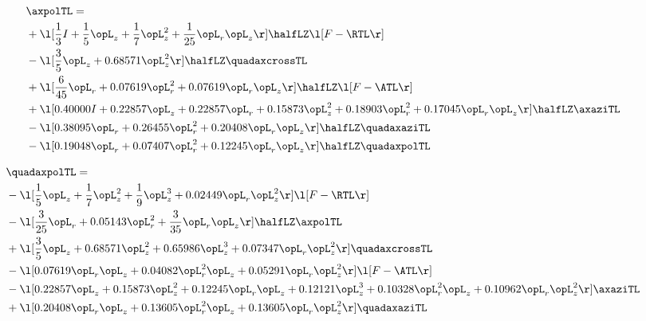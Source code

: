 \begin{alignat}{2} 
\label{eq:linaxpolTL_1} 
& \axpolTL = \\ 
& + \l[ \frac{1}{3} I + \frac{1}{5} \opL_z + \frac{1}{7} \opL_z^{2} + \frac{1}{25} \opL_r \opL_z  \r] \halfLZ \l[ F - \RTL \r] \nonumber \\ 
& - \l[ \frac{3}{5} \opL_z +  0.68571 \opL_z^{2}  \r] \halfLZ \quadaxcrossTL \nonumber \\ 
& + \l[ \frac{6}{45} \opL_r +  0.07619 \opL_r^{2} +  0.07619 \opL_r \opL_z  \r] \halfLZ \l[ F - \ATL \r] \nonumber \\ 
& + \l[  0.40000 I +  0.22857 \opL_z +  0.22857 \opL_r +  0.15873 \opL_z^{2} +  0.18903 \opL_r^{2} +  0.17045 \opL_r \opL_z  \r] \halfLZ \axaziTL \nonumber \\ 
& - \l[  0.38095 \opL_r +  0.26455 \opL_r^{2} +  0.20408 \opL_r \opL_z  \r] \halfLZ \quadaxaziTL \nonumber \\ 
& - \l[  0.19048 \opL_r +  0.07407 \opL_r^{2} +  0.12245 \opL_r \opL_z  \r] \halfLZ \quadaxpolTL \nonumber \\ 
\end{alignat} 


\begin{alignat}{2} 
\label{eq:quadaxpolTL_1} 
& \quadaxpolTL = \\ 
& - \l[ \frac{1}{5} \opL_z + \frac{1}{7} \opL_z^{2} + \frac{1}{9} \opL_z^{3} +  0.02449 \opL_r \opL_z^{2}  \r] \l[ F - \RTL \r] \nonumber \\ 
& - \l[ \frac{3}{25} \opL_r +  0.05143 \opL_r^{2} + \frac{3}{35} \opL_r \opL_z  \r] \halfLZ \axpolTL \nonumber \\ 
& + \l[ \frac{3}{5} \opL_z +  0.68571 \opL_z^{2} +  0.65986 \opL_z^{3} +  0.07347 \opL_r \opL_z^{2}  \r] \quadaxcrossTL \nonumber \\ 
& - \l[  0.07619 \opL_r \opL_z +  0.04082 \opL_r^{2} \opL_z +  0.05291 \opL_r \opL_z^{2}  \r] \l[ F - \ATL \r] \nonumber \\ 
& - \l[  0.22857 \opL_z +  0.15873 \opL_z^{2} +  0.12245 \opL_r \opL_z +  0.12121 \opL_z^{3} +  0.10328 \opL_r^{2} \opL_z +  0.10962 \opL_r \opL_z^{2}  \r] \axaziTL \nonumber \\ 
& + \l[  0.20408 \opL_r \opL_z +  0.13605 \opL_r^{2} \opL_z +  0.13605 \opL_r \opL_z^{2}  \r] \quadaxaziTL \nonumber \\ 
\end{alignat} 


